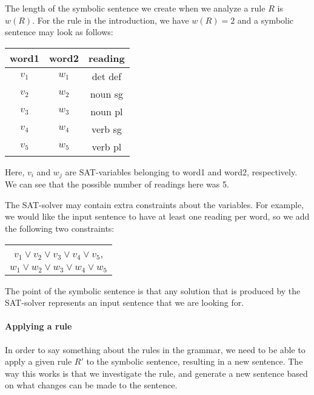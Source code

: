 The length of the symbolic sentence we create when we analyze a rule $R$ is $w(R)$. For the rule in the introduction, we have $w(R)=2$ and a symbolic sentence may look as follows:
\begin{center}
\begin{tabular}{c|c|c}
word1 & word2 & reading \\
\hline
$v_1$ & $w_1$ & det def \\
$v_2$ & $w_2$ & noun sg \\
$v_3$ & $w_3$ & noun pl \\
$v_4$ & $w_4$ & verb sg \\
$v_5$ & $w_5$ & verb pl \\
\end{tabular}
\end{center}
Here, $v_i$ and $w_j$ are SAT-variables belonging to word1 and word2, respectively. We can see that the possible number of readings here was 5.

The SAT-solver may contain extra constraints about the variables. For example, we would like the input sentence to have at least one reading per word, so we add the following two constraints:
\begin{center}
\begin{tabular}{c}
$v_1 \vee v_2 \vee v_3 \vee v_4 \vee v_5$, \\
$w_1 \vee w_2 \vee w_3 \vee w_4 \vee w_5$ \\
\end{tabular}
\end{center}
The point of the symbolic sentence is that any solution that is produced by the SAT-solver represents an input sentence that we are looking for.

\paragraph{Applying a rule}

In order to say something about the rules in the grammar, we need to be able to apply a given rule $R'$ to the symbolic sentence, resulting in a new sentence. The way this works is that we investigate the rule, and generate a new sentence based on what changes can be made to the sentence.

